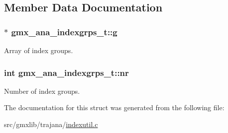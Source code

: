 \subsection{\-Member \-Data \-Documentation}
\hypertarget{structgmx__ana__indexgrps__t_a01062d16d7c0fbbfffd3de0098d367f1}{
\subsubsection[{g}]{$\ast$ {\bf gmx\-\_\-ana\-\_\-indexgrps\-\_\-t\-::g}}}\label{structgmx__ana__indexgrps__t_a01062d16d7c0fbbfffd3de0098d367f1}
\-Array of index groups. \hypertarget{structgmx__ana__indexgrps__t_a99e2f47b1d3e5122125d636f06df51ba}{
\subsubsection[{nr}]{\setlength{\rightskip}{0pt plus 5cm}int {\bf gmx\-\_\-ana\-\_\-indexgrps\-\_\-t\-::nr}}}\label{structgmx__ana__indexgrps__t_a99e2f47b1d3e5122125d636f06df51ba}
\-Number of index groups. 

\-The documentation for this struct was generated from the following file\-:\begin{DoxyCompactItemize}
\item 
src/gmxlib/trajana/\hyperlink{indexutil_8c}{indexutil.\-c}\end{DoxyCompactItemize}
